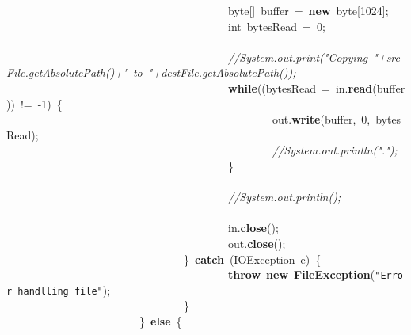 \mbox{}\ \ \ \ \ \ \ \ \ \ \ \ \ \ \ \ \ \ \ \ \ \ \ \ \ \ \ \ \ \ \ \ \ \ \ \ \ \ \ \ byte[]\ buffer\ =\ \textbf{new}\ byte[1024]; \\
\mbox{}\ \ \ \ \ \ \ \ \ \ \ \ \ \ \ \ \ \ \ \ \ \ \ \ \ \ \ \ \ \ \ \ \ \ \ \ \ \ \ \ int\ bytesRead\ =\ 0; \\
\mbox{}\ \ \ \ \ \ \ \ \ \ \ \ \ \ \ \ \ \ \ \ \ \ \ \ \ \ \ \ \ \ \ \ \ \ \ \ \ \ \ \  \\
\mbox{}\ \ \ \ \ \ \ \ \ \ \ \ \ \ \ \ \ \ \ \ \ \ \ \ \ \ \ \ \ \ \ \ \ \ \ \ \ \ \ \ \textit{//System.out.print("{}Copying\ "{}+srcFile.getAbsolutePath()+"{}\ to\ "{}+destFile.getAbsolutePath());} \\
\mbox{}\ \ \ \ \ \ \ \ \ \ \ \ \ \ \ \ \ \ \ \ \ \ \ \ \ \ \ \ \ \ \ \ \ \ \ \ \ \ \ \ \textbf{while}((bytesRead\ =\ in.\textbf{read}(buffer))\ !=\ -1)\ \{ \\
\mbox{}\ \ \ \ \ \ \ \ \ \ \ \ \ \ \ \ \ \ \ \ \ \ \ \ \ \ \ \ \ \ \ \ \ \ \ \ \ \ \ \ \ \ \ \ \ \ \ \ out.\textbf{write}(buffer,\ 0,\ bytesRead); \\
\mbox{}\ \ \ \ \ \ \ \ \ \ \ \ \ \ \ \ \ \ \ \ \ \ \ \ \ \ \ \ \ \ \ \ \ \ \ \ \ \ \ \ \ \ \ \ \ \ \ \ \textit{//System.out.println("{}."{});} \\
\mbox{}\ \ \ \ \ \ \ \ \ \ \ \ \ \ \ \ \ \ \ \ \ \ \ \ \ \ \ \ \ \ \ \ \ \ \ \ \ \ \ \ \} \\
\mbox{} \\
\mbox{}\ \ \ \ \ \ \ \ \ \ \ \ \ \ \ \ \ \ \ \ \ \ \ \ \ \ \ \ \ \ \ \ \ \ \ \ \ \ \ \ \textit{//System.out.println();} \\
\mbox{}\ \ \ \ \ \ \ \  \\
\mbox{}\ \ \ \ \ \ \ \ \ \ \ \ \ \ \ \ \ \ \ \ \ \ \ \ \ \ \ \ \ \ \ \ \ \ \ \ \ \ \ \ in.\textbf{close}(); \\
\mbox{}\ \ \ \ \ \ \ \ \ \ \ \ \ \ \ \ \ \ \ \ \ \ \ \ \ \ \ \ \ \ \ \ \ \ \ \ \ \ \ \ out.\textbf{close}(); \\
\mbox{}\ \ \ \ \ \ \ \ \ \ \ \ \ \ \ \ \ \ \ \ \ \ \ \ \ \ \ \ \ \ \ \ \}\ \textbf{catch}\ (IOException\ e)\ \{ \\
\mbox{}\ \ \ \ \ \ \ \ \ \ \ \ \ \ \ \ \ \ \ \ \ \ \ \ \ \ \ \ \ \ \ \ \ \ \ \ \ \ \ \ \textbf{throw}\ \textbf{new}\ \textbf{FileException}(\texttt{"{}Error\ handlling\ file"{}}); \\
\mbox{}\ \ \ \ \ \ \ \ \ \ \ \ \ \ \ \ \ \ \ \ \ \ \ \ \ \ \ \ \ \ \ \ \} \\
\mbox{}\ \ \ \ \ \ \ \ \ \ \ \ \ \ \ \ \ \ \ \ \ \ \ \ \}\ \textbf{else}\ \{ \\
